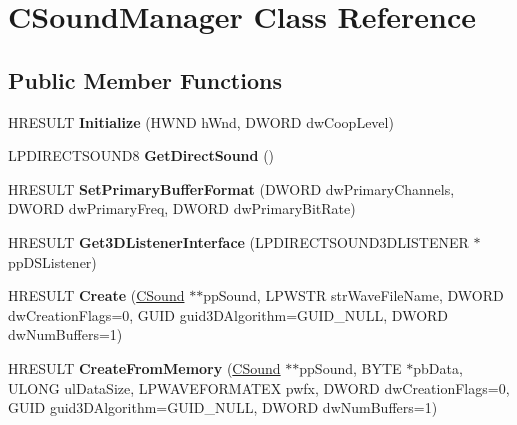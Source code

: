 \hypertarget{class_c_sound_manager}{\section{C\+Sound\+Manager Class Reference}
\label{class_c_sound_manager}
}
\subsection*{Public Member Functions}
\begin{DoxyCompactItemize}
\item 
\hypertarget{class_c_sound_manager_a5360f8c247b45d00f141b528892ac4dc}{H\+R\+E\+S\+U\+L\+T {\bfseries Initialize} (H\+W\+N\+D h\+Wnd, D\+W\+O\+R\+D dw\+Coop\+Level)}\label{class_c_sound_manager_a5360f8c247b45d00f141b528892ac4dc}

\item 
\hypertarget{class_c_sound_manager_a4cf5b72143f7bb5f268b4152008de1dd}{L\+P\+D\+I\+R\+E\+C\+T\+S\+O\+U\+N\+D8 {\bfseries Get\+Direct\+Sound} ()}\label{class_c_sound_manager_a4cf5b72143f7bb5f268b4152008de1dd}

\item 
\hypertarget{class_c_sound_manager_a2e20be973d38797e82362577b9156927}{H\+R\+E\+S\+U\+L\+T {\bfseries Set\+Primary\+Buffer\+Format} (D\+W\+O\+R\+D dw\+Primary\+Channels, D\+W\+O\+R\+D dw\+Primary\+Freq, D\+W\+O\+R\+D dw\+Primary\+Bit\+Rate)}\label{class_c_sound_manager_a2e20be973d38797e82362577b9156927}

\item 
\hypertarget{class_c_sound_manager_aac5c452d3d4314c8d3aeb16f9c143652}{H\+R\+E\+S\+U\+L\+T {\bfseries Get3\+D\+Listener\+Interface} (L\+P\+D\+I\+R\+E\+C\+T\+S\+O\+U\+N\+D3\+D\+L\+I\+S\+T\+E\+N\+E\+R $\ast$pp\+D\+S\+Listener)}\label{class_c_sound_manager_aac5c452d3d4314c8d3aeb16f9c143652}

\item 
\hypertarget{class_c_sound_manager_a7fb7f2a69f7b703da0c81988733d7e31}{H\+R\+E\+S\+U\+L\+T {\bfseries Create} (\hyperlink{class_c_sound}{C\+Sound} $\ast$$\ast$pp\+Sound, L\+P\+W\+S\+T\+R str\+Wave\+File\+Name, D\+W\+O\+R\+D dw\+Creation\+Flags=0, G\+U\+I\+D guid3\+D\+Algorithm=G\+U\+I\+D\+\_\+\+N\+U\+L\+L, D\+W\+O\+R\+D dw\+Num\+Buffers=1)}\label{class_c_sound_manager_a7fb7f2a69f7b703da0c81988733d7e31}

\item 
\hypertarget{class_c_sound_manager_aeb9aceb7a20e21ec18922fe71cd58307}{H\+R\+E\+S\+U\+L\+T {\bfseries Create\+From\+Memory} (\hyperlink{class_c_sound}{C\+Sound} $\ast$$\ast$pp\+Sound, B\+Y\+T\+E $\ast$pb\+Data, U\+L\+O\+N\+G ul\+Data\+Size, L\+P\+W\+A\+V\+E\+F\+O\+R\+M\+A\+T\+E\+X pwfx, D\+W\+O\+R\+D dw\+Creation\+Flags=0, G\+U\+I\+D guid3\+D\+Algorithm=G\+U\+I\+D\+\_\+\+N\+U\+L\+L, D\+W\+O\+R\+D dw\+Num\+Buffers=1)}\label{class_c_sound_manager_aeb9aceb7a20e21ec18922fe71cd58307}


\end{DoxyCompactItemize}
